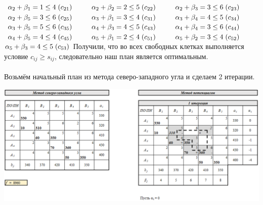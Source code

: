 \documentclass[14pt,a4paper,fleqn]{extarticle}
\begin{document}
$\alpha_2 + \beta_1 = 1 \leq 4 \hspace*{0.1cm} (c_{21}) \hspace*{1cm} \alpha_2 + \beta_2 = 2 \leq 5 \hspace*{0.1cm} (c_{22}) \hspace*{1cm} \alpha_2 + \beta_3 = 3 \leq 6 \hspace*{0.1cm} (c_{23})$\\
$\alpha_2 + \beta_5 = 3 \leq 6 \hspace*{0.1cm} (c_{25}) \hspace*{1cm} \alpha_3 + \beta_1 = 3 \leq 4 \hspace*{0.1cm} (c_{31}) \hspace*{1cm} \alpha_3 + \beta_4 = 4 \leq 5 \hspace*{0.1cm} (c_{34})$\\
$\alpha_3 + \beta_5 = 5 \leq 6 \hspace*{0.1cm} (c_{35}) \hspace*{1cm} \alpha_4 + \beta_3 = 4 \leq 5 \hspace*{0.1cm} (c_{43}) \hspace*{1cm} \alpha_4 + \beta_4 = 3 \leq 6 \hspace*{0.1cm} (c_{44})$\\
$\alpha_4 + \beta_5 = 4 \leq 4 \hspace*{0.1cm} (c_{45}) \hspace*{1cm} \alpha_5 + \beta_1 = 2 \leq 4 \hspace*{0.1cm} (c_{51}) \hspace*{1cm} \alpha_5 + \beta_2 = 3 \leq 4 \hspace*{0.1cm} (c_{52})$\\
$\alpha_5 + \beta_3 = 4 \leq 5 \hspace*{0.1cm} (c_{53})$
\newpage
Получили, что во всех свободных клетках выполняется условие $c_{ij} \geq s_{ij}$, следовательно наш план является оптимальным.\\\\
Возьмём начальный план из метода северо-западного угла и сделаем 2 итерации.
\begin{center}
	\includegraphics[scale=0.45]{16}
\end{center}
\end{document}
